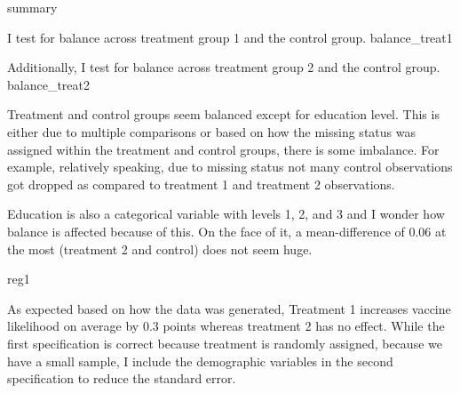 \documentclass[11pt]{article}
\begin{document}
	{summary}
	
	I test for balance across treatment group 1 and the control group. 
	{balance_treat1}
	
	Additionally, I test for balance across treatment group 2 and the control group. 
	{balance_treat2}
	
	Treatment and control groups seem balanced except for education level. This is either due to multiple comparisons or based on how the missing status was assigned within the treatment and control groups, there is some imbalance. For example, relatively speaking, due to missing status not many control observations got dropped as compared to treatment 1 and treatment 2 observations.
	
	Education is also a categorical variable with levels 1, 2, and 3 and I wonder how balance is affected because of this. On the face of it, a mean-difference of 0.06 at the most (treatment 2 and control) does not seem huge. 
	
	{reg1}
	
	As expected based on how the data was generated, Treatment 1 increases vaccine likelihood on average by 0.3 points whereas treatment 2 has no effect. While the first specification is correct because treatment is randomly assigned, because we have a small sample, I include the demographic variables in the second specification to reduce the standard error. 
\end{document}
